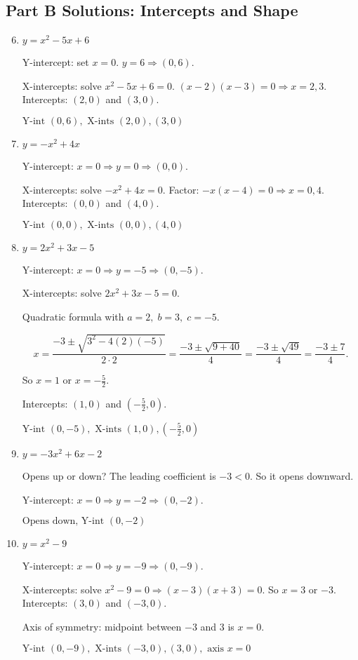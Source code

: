 \documentclass[12pt]{article}
\begin{document}
\subsection*{Part B Solutions: Intercepts and Shape}
\begin{enumerate}
  \setcounter{enumi}{5}
  \item \(y = x^2 - 5x + 6\)

  Y-intercept: set \(x = 0\).  
  \(y = 6 \Rightarrow (0, 6).\)

  X-intercepts: solve \(x^2 - 5x + 6 = 0.\)  
  \((x - 2)(x - 3) = 0 \Rightarrow x = 2, 3.\)  
  Intercepts: \((2, 0)\) and \((3, 0).\)

  \(\boxed{\text{Y-int } (0, 6), \text{ X-ints } (2, 0), (3, 0)}\)

  \item \(y = -x^2 + 4x\)

  Y-intercept: \(x = 0 \Rightarrow y = 0 \Rightarrow (0, 0).\)

  X-intercepts: solve \(-x^2 + 4x = 0.\)  
  Factor: \(-x(x - 4) = 0 \Rightarrow x = 0, 4.\)  
  Intercepts: \((0, 0)\) and \((4, 0).\)

  \(\boxed{\text{Y-int } (0, 0), \text{ X-ints } (0, 0), (4, 0)}\)

  \item \(y = 2x^2 + 3x - 5\)

  Y-intercept: \(x = 0 \Rightarrow y = -5 \Rightarrow (0, -5).\)

  X-intercepts: solve \(2x^2 + 3x - 5 = 0.\)

  Quadratic formula with \(a = 2,\; b = 3,\; c = -5.\)

  \[
  x = \frac{-3 \pm \sqrt{3^2 - 4(2)(-5)}}{2 \cdot 2}
  = \frac{-3 \pm \sqrt{9 + 40}}{4}
  = \frac{-3 \pm \sqrt{49}}{4}
  = \frac{-3 \pm 7}{4}.
  \]

  So \(x = 1\) or \(x = -\tfrac{5}{2}.\)

  Intercepts: \((1, 0)\) and \(\left(-\tfrac{5}{2}, 0\right).\)

  \(\boxed{\text{Y-int } (0, -5), \text{ X-ints } (1, 0), (-\tfrac{5}{2}, 0)}\)

  \item \(y = -3x^2 + 6x - 2\)

  Opens up or down? The leading coefficient is \(-3 < 0.\)  
  So it opens downward.

  Y-intercept: \(x = 0 \Rightarrow y = -2 \Rightarrow (0, -2).\)

  \(\boxed{\text{Opens down, Y-int } (0, -2)}\)

  \item \(y = x^2 - 9\)

  Y-intercept: \(x = 0 \Rightarrow y = -9 \Rightarrow (0, -9).\)

  X-intercepts: solve \(x^2 - 9 = 0 \Rightarrow (x - 3)(x + 3) = 0.\)  
  So \(x = 3\) or \(-3.\)  
  Intercepts: \((3, 0)\) and \((-3, 0).\)

  Axis of symmetry: midpoint between \(-3\) and \(3\) is \(x = 0.\)

  \(\boxed{\text{Y-int } (0, -9), \text{ X-ints } (-3, 0), (3, 0), \text{ axis } x = 0}\)
\end{enumerate}
\end{document}
